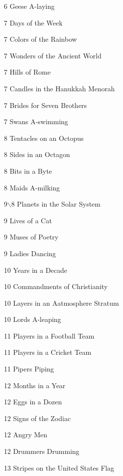 \documentclass[10pt]{article}
\begin{document}
\begin{multicols}{4}
\begin{description}
	\item 6 \w G{eese} \w A{-laying}
    \item 7 \w D{ays} of the \w W{eek}
    \item 7 \w C{olors} of the \w R{ainbow}
    \item 7 \w W{onders} of the \w A{ncient} \w W{orld}
    \item 7 \w H{ills} of \w R{ome}
    \item 7 \w C{andles} in the \w H{anukkah} \w M{enorah}
    \item 7 \w B{rides} for \w S{even} \w B{rothers}
	\item 7 \w S{wans} \w A{-swimming}
    \item 8 \w T{entacles} on an \w O{ctopus}
    \item 8 \w S{ides} in an \w O{ctagon}
    \item 8 \w B{its} in a \w B{yte}
	\item 8 \w M{aids} \w A{-milking}
    \item 9\!\!\!$\backslash$8 \w P{lanets} in the \w S{olar} \w S{ystem}
    \item 9 \w L{ives} of a \w C{at}
    \item 9 \w M{uses} of \w P{oetry}
	\item 9 \w L{adies} \w D{ancing}
    \item 10 \w Y{ears} in a \w D{ecade}
    \item 10 \w C{ommandments} of \w C{hristianity}
     \item 10 \w L{ayers}  in an \w A{atmosphere} \w S{tratum}
	\item 10 \w \w L{ords} \w A{-leaping}
    \item 11 \w P{layers} in a \w F{ootball} \w T{eam}
    \item 11 \w P{layers}  in a \w C{ricket} \w T{eam}
	\item 11 \w P{ipers} \w P{iping}
    \item 12 \w M{onths} in a \w Y{ear}
    \item 12 \w E{ggs} in a \w D{ozen}
    \item 12 \w S{igns} of the \w Z{odiac}
	\item 12 \w A{ngry} \w M{en}
	\item 12 \w D{rummers} \w D{rumming}
    \item 13 \w S{tripes} on the \w U{nited} \w S{tates} \w F{lag}

\end{description}
\end{multicols}
\end{document}
